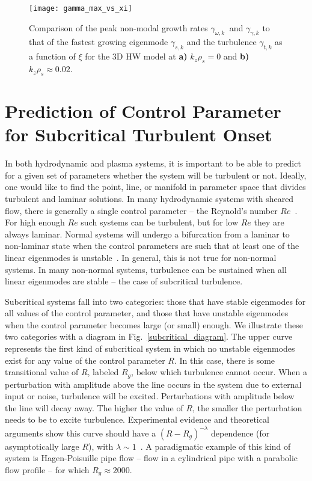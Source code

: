 \documentclass[twocolumn,showkeys,superscriptaddress]{revtex4}
\begin{document}
\begin{figure}
\centerline{\texttt{[image: gamma\_max\_vs\_xi]}}
\caption{Comparison of the peak non-modal growth rates $\gamma_{\omega,k} \ $ and $\gamma_{\gamma,k}$ to that of the fastest growing eigenmode $\gamma_{s,k}$ 
and the turbulence $\gamma_{t,k}$ as a function of $\xi$ for the 3D HW model at {\bf a)} $k_z \rho_s = 0$ and {\bf b)} $k_z \rho_s \approx 0.02$. }
\label{gamma_max_vs_xi}
\end{figure}

\section{Prediction of Control Parameter for Subcritical Turbulent Onset}
\label{sec_subcrit_prediction}

In both hydrodynamic and plasma systems, it is important to be able to predict for a given set of parameters whether the system will be turbulent or not.
Ideally, one would like to find the point, line, or manifold in parameter space that divides turbulent and laminar solutions.
In many hydrodynamic systems with sheared flow, there is generally a single control parameter -- the Reynold's number $Re$~\cite{drazin1981}. For high enough $Re$ such systems
can be turbulent, but for low $Re$ they are always laminar.
Normal systems will undergo a bifurcation from a laminar to non-laminar state when the control parameters are such that at least one of the linear eigenmodes is unstable~\cite{grossmann2000}.
In general, this is not true for non-normal systems. In many non-normal systems, turbulence can be sustained when all linear eigenmodes are stable -- the case of subcritical turbulence. 

Subcritical systems fall into two categories: those that have stable eigenmodes for all values of the control parameter, and those that have unstable eigenmodes
when the control parameter becomes large (or small) enough. We illustrate these two categories with a diagram in Fig.~\ref{subcritical_diagram}. 
The upper curve represents the first kind of subcritical system in which no unstable eigenmodes exist for any value of the control parameter $R$. In this
case, there is some transitional value of $R$, labeled $R_g$, below which turbulence cannot occur. When a perturbation with amplitude above the line occurs in the system due to external input or noise, 
turbulence will be excited. Perturbations with amplitude below the line will decay away. The higher the value of $R$, the smaller the perturbation needs to be to excite turbulence.
Experimental evidence and theoretical arguments show this curve should have a $(R-R_g)^{-\lambda}$ dependence (for asymptotically large $R$), with $\lambda \sim 1$~\cite{waleffe1995b,grossmann2000,hof2003}.
A paradigmatic example of this kind of system is Hagen-Poisuille pipe flow -- flow in a cylindrical pipe with a parabolic flow profile -- for which $R_g \approx 2000$.
\end{document}
